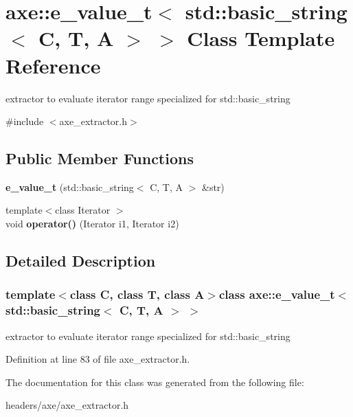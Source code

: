 \hypertarget{classaxe_1_1e__value__t_3_01std_1_1basic__string_3_01C_00_01T_00_01A_01_4_01_4}{\section{axe\+:\+:e\+\_\+value\+\_\+t$<$ std\+:\+:basic\+\_\+string$<$ C, T, A $>$ $>$ Class Template Reference}
\label{classaxe_1_1e__value__t_3_01std_1_1basic__string_3_01C_00_01T_00_01A_01_4_01_4}
}


extractor to evaluate iterator range specialized for std\+::basic\+\_\+string  




{\ttfamily \#include $<$axe\+\_\+extractor.\+h$>$}

\subsection*{Public Member Functions}
\begin{DoxyCompactItemize}
\item 
\hypertarget{classaxe_1_1e__value__t_3_01std_1_1basic__string_3_01C_00_01T_00_01A_01_4_01_4_a1b66ad5329314ff29268c37dce5e47d9}{{\bfseries e\+\_\+value\+\_\+t} (std\+::basic\+\_\+string$<$ C, T, A $>$ \&str)}\label{classaxe_1_1e__value__t_3_01std_1_1basic__string_3_01C_00_01T_00_01A_01_4_01_4_a1b66ad5329314ff29268c37dce5e47d9}

\item 
\hypertarget{classaxe_1_1e__value__t_3_01std_1_1basic__string_3_01C_00_01T_00_01A_01_4_01_4_a9ef5111c65409532a4b9bd1e895bbd13}{{\footnotesize template$<$class Iterator $>$ }\\void {\bfseries operator()} (Iterator i1, Iterator i2)}\label{classaxe_1_1e__value__t_3_01std_1_1basic__string_3_01C_00_01T_00_01A_01_4_01_4_a9ef5111c65409532a4b9bd1e895bbd13}

\end{DoxyCompactItemize}


\subsection{Detailed Description}
\subsubsection*{template$<$class C, class T, class A$>$class axe\+::e\+\_\+value\+\_\+t$<$ std\+::basic\+\_\+string$<$ C, T, A $>$ $>$}

extractor to evaluate iterator range specialized for std\+::basic\+\_\+string 

Definition at line 83 of file axe\+\_\+extractor.\+h.



The documentation for this class was generated from the following file\+:\begin{DoxyCompactItemize}
\item 
headers/axe/axe\+\_\+extractor.\+h\end{DoxyCompactItemize}

